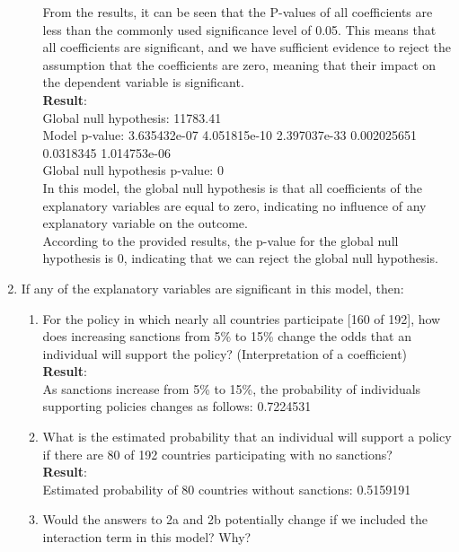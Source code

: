 \documentclass[12pt,letterpaper]{article}
\begin{document}
\begin{enumerate}
\begin{enumerate}
		From the results, it can be seen that the P-values of all coefficients are less than the commonly used significance level of 0.05. This means that all coefficients are significant, and we have sufficient evidence to reject the assumption that the coefficients are zero, meaning that their impact on the dependent variable is significant.\\
		 
		\textbf{Result}:\\
		Global null hypothesis: 11783.41 \\
		Model p-value: 3.635432e-07 4.051815e-10 2.397037e-33 0.002025651 0.0318345 1.014753e-06 \\
		Global null hypothesis p-value: 0 \\
		In this model, the global null hypothesis is that all coefficients of the explanatory variables are equal to zero, indicating no influence of any explanatory variable on the outcome.\\
		According to the provided results, the p-value for the global null hypothesis is 0, indicating that we can reject the global null hypothesis.
		
	\end{enumerate}
	
	\item
	If any of the explanatory variables are significant in this model, then:
	\begin{enumerate}
		\item
		For the policy in which nearly all countries participate [160 of 192], how does increasing sanctions from 5\% to 15\% change the odds that an individual will support the policy? (Interpretation of a coefficient)\\
		 
		\textbf{Result}:\\
		As sanctions increase from 5\% to 15\%, the probability of individuals supporting policies changes as follows: 0.7224531 \\
		\item
		What is the estimated probability that an individual will support a policy if there are 80 of 192 countries participating with no sanctions? \\
		 
		\textbf{Result}:\\
		Estimated probability of 80 countries without sanctions: 0.5159191 \\
		\item
		Would the answers to 2a and 2b potentially change if we included the interaction term in this model? Why? \\
		

\end{enumerate}
\end{enumerate}
\end{document}
